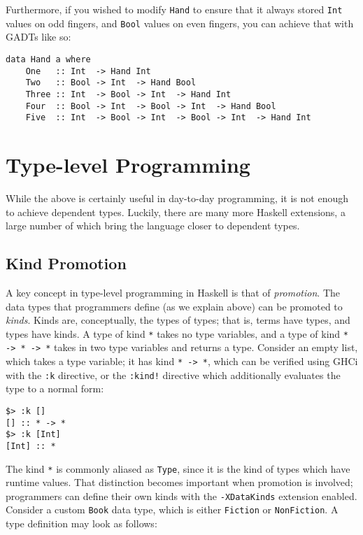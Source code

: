 \documentclass[12pt, a4paper, bibliography=totocnumbered]{scrreprt}
\newcommand{\inline}[1]{\lstinline[basicstyle=\ttfamily\footnotesize]{#1}}
\begin{document}
Furthermore, if you wished to modify \inline{Hand} to ensure that it always stored \inline{Int} values on odd fingers, and \inline{Bool} values on even fingers, you can achieve that with GADTs like so:

\begin{lstlisting}
data Hand a where
    One   :: Int  -> Hand Int
    Two   :: Bool -> Int  -> Hand Bool
    Three :: Int  -> Bool -> Int  -> Hand Int
    Four  :: Bool -> Int  -> Bool -> Int  -> Hand Bool
    Five  :: Int  -> Bool -> Int  -> Bool -> Int  -> Hand Int
\end{lstlisting}

\section{Type-level Programming}

While the above is certainly useful in day-to-day programming, it is not enough to achieve dependent types. Luckily, there are many more Haskell extensions, a large number of which bring the language closer to dependent types.

\subsection{Kind Promotion}

A key concept in type-level programming in Haskell is that of \emph{promotion}. The data types that programmers define (as we explain above) can be promoted to \emph{kinds}. Kinds are, conceptually, the types of types; that is, terms have types, and types have kinds. A type of kind \inline{*} takes no type variables, and a type of kind \inline{* -> * -> *} takes in two type variables and returns a type. Consider an empty list, which takes a type variable; it has kind \inline{* -> *}, which can be verified using GHCi with the \inline{:k} directive, or the \inline{:kind!} directive which additionally evaluates the type to a normal form:

\begin{lstlisting}
$> :k []
[] :: * -> *
$> :k [Int]
[Int] :: *
\end{lstlisting}

The kind \inline{*} is commonly aliased as \inline{Type}, since it is the kind of types which have runtime values. That distinction becomes important when promotion is involved; programmers can define their own kinds with the \inline{-XDataKinds} extension enabled. Consider a custom \inline{Book} data type, which is either \inline{Fiction} or \inline{NonFiction}. A type definition may look as follows:
\end{document}
